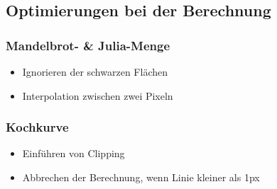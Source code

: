 \documentclass[unknownkeysallowed]{beamer}
\begin{document}
\subsection{Optimierungen bei der Berechnung}
\begin{frame}
  \frametitle{Mandelbrot- \& Julia-Menge}
  \begin{itemize}
    \item Ignorieren der schwarzen Flächen
    \item Interpolation zwischen zwei Pixeln
  \end{itemize}
\end{frame}
\begin{frame}
  \frametitle{Kochkurve}
  \begin{itemize}
    \item Einführen von Clipping
    \item Abbrechen der Berechnung, wenn Linie kleiner als 1px
  \end{itemize}
\end{frame}
\end{document}
